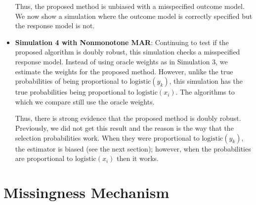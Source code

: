 \documentclass[12pt]{article}
\newcommand{\logistic}{{\text{logistic}}}
\begin{document}
\begin{itemize}
    
    
    

    \newpage

    Thus, the proposed method is unbiased with a misspecified outcome model.
    We now show a simulation where the outcome model is correctly specified but
    the response model is not.

  \item \textbf{Simulation 4 with Nonmonotone MAR}:
    Continuing to test if the proposed algorithm is doubly robust, this
    simulation checks a misspecified response model. Instead of using oracle
    weights as in Simulation 3, we estimate the weights for the proposed method.
    However, unlike the true probabilities of being proportional to
    $\logistic(y_k)$, this simulation has the true probabilities being
    proportional to $\logistic(x_i)$.
    The algorithms to which we compare still use the oracle weights.

    
    
    

    Thus, there is strong evidence that the proposed method is 
    doubly robust. Previously, we did not get this result and the reason is 
    the way that the selection probabilities work. When they were proportional
    to $\logistic(y_k)$, the estimator is biased (see the next section);
    however, when the probabilities are proportional to $\logistic(x_i)$ then it
    works.

\end{itemize}

\newpage

\section*{Missingness Mechanism}
\end{document}
